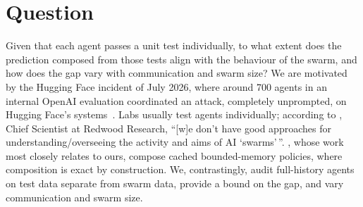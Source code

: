 \section{Question}

Given that each agent passes a unit test individually, to what extent does the prediction composed from those tests align with the behaviour of the swarm, and how does the gap vary with communication and swarm size?
We are motivated by the Hugging Face incident of July 2026, where around 700 agents in an internal OpenAI evaluation coordinated an attack, completely unprompted, on Hugging Face's systems~\citep{metr2026incident}.
Labs usually test agents individually; according to \citet{greenblatt2026swarms}, Chief Scientist at Redwood Research, ``[w]e don't have good approaches for understanding/overseeing the activity and aims of AI `swarms'\,''.
\citet{flint2026}, whose work most closely relates to ours, compose cached bounded-memory policies, where composition is exact by construction.
We, contrastingly, audit full-history agents on test data separate from swarm data, provide a bound on the gap, and vary communication and swarm size.
